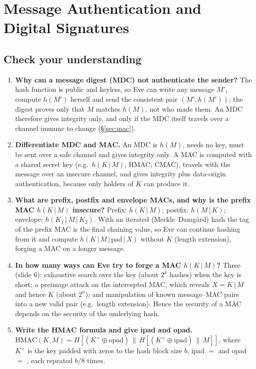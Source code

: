 \section{Message Authentication and Digital Signatures}\label{q:mac}

\subsection*{Check your understanding}
\begin{enumerate}[leftmargin=1.6em,itemsep=3pt]
  \item \textbf{Why can a message digest (MDC) not authenticate the sender?} The hash function is public and keyless, so Eve can write any message $M'$, compute $h(M')$ herself and send the consistent pair $(M', h(M'))$; the digest proves only that $M$ matches $h(M)$, not who made them. An MDC therefore gives integrity only, and only if the MDC itself travels over a channel immune to change (\S\ref{sec:mac}).
  \item \textbf{Differentiate MDC and MAC.} An MDC is $h(M)$, needs no key, must be sent over a safe channel and gives integrity only. A MAC is computed with a shared secret key (e.g.\ $h(K \,|\, M)$, HMAC, CMAC), travels with the message over an insecure channel, and gives integrity plus data-origin authentication, because only holders of $K$ can produce it.
  \item \textbf{What are prefix, postfix and envelope MACs, and why is the prefix MAC $h(K \,|\, M)$ insecure?} Prefix: $h(K \,|\, M)$; postfix: $h(M \,|\, K)$; envelope: $h(K_1 \,|\, M \,|\, K_2)$. With an iterated (Merkle--Damg\aa rd) hash the tag of the prefix MAC is the final chaining value, so Eve can continue hashing from it and compute $h(K \,|\, M \,|\, \text{pad} \,|\, X)$ without $K$ (length extension), forging a MAC on a longer message.
  \item \textbf{In how many ways can Eve try to forge a MAC $h(K \,|\, M)$?} Three (slide 6): exhaustive search over the key (about $2^k$ hashes) when the key is short; a preimage attack on the intercepted MAC, which reveals $X = K \,|\, M$ and hence $K$ (about $2^n$); and manipulation of known message--MAC pairs into a new valid pair (e.g.\ length extension). Hence the security of a MAC depends on the security of the underlying hash.
  \item \textbf{Write the HMAC formula and give ipad and opad.} $\mathrm{HMAC}(K, M) = H[(K^+ \oplus \mathrm{opad}) \,\|\, H[(K^+ \oplus \mathrm{ipad}) \,\|\, M]]$, where $K^+$ is the key padded with zeros to the hash block size $b$, ipad $= $  and opad $= $ , each repeated $b/8$ times.

\end{enumerate}
